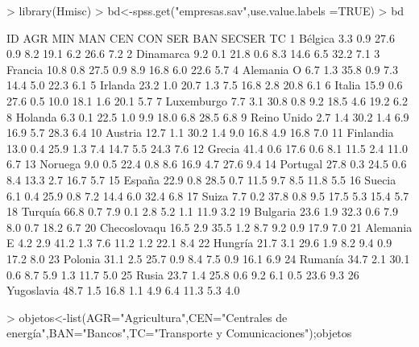 \documentclass{article}
\begin{document}
\begin{Schunk}
\begin{Sinput}
> library(Hmisc)
> bd<-spss.get("empresas.sav",use.value.labels =TRUE)
> bd
\end{Sinput}
\begin{Soutput}
             ID  AGR MIN  MAN CEN  CON  SER  BAN SECSER  TC
1  Bélgica       3.3 0.9 27.6 0.9  8.2 19.1  6.2   26.6 7.2
2  Dinamarca     9.2 0.1 21.8 0.6  8.3 14.6  6.5   32.2 7.1
3  Francia      10.8 0.8 27.5 0.9  8.9 16.8  6.0   22.6 5.7
4  Alemania O    6.7 1.3 35.8 0.9  7.3 14.4  5.0   22.3 6.1
5  Irlanda      23.2 1.0 20.7 1.3  7.5 16.8  2.8   20.8 6.1
6  Italia       15.9 0.6 27.6 0.5 10.0 18.1  1.6   20.1 5.7
7  Luxemburgo    7.7 3.1 30.8 0.8  9.2 18.5  4.6   19.2 6.2
8  Holanda       6.3 0.1 22.5 1.0  9.9 18.0  6.8   28.5 6.8
9  Reino Unido   2.7 1.4 30.2 1.4  6.9 16.9  5.7   28.3 6.4
10 Austria      12.7 1.1 30.2 1.4  9.0 16.8  4.9   16.8 7.0
11 Finlandia    13.0 0.4 25.9 1.3  7.4 14.7  5.5   24.3 7.6
12 Grecia       41.4 0.6 17.6 0.6  8.1 11.5  2.4   11.0 6.7
13 Noruega       9.0 0.5 22.4 0.8  8.6 16.9  4.7   27.6 9.4
14 Portugal     27.8 0.3 24.5 0.6  8.4 13.3  2.7   16.7 5.7
15 España       22.9 0.8 28.5 0.7 11.5  9.7  8.5   11.8 5.5
16 Suecia        6.1 0.4 25.9 0.8  7.2 14.4  6.0   32.4 6.8
17 Suiza         7.7 0.2 37.8 0.8  9.5 17.5  5.3   15.4 5.7
18 Turquía      66.8 0.7  7.9 0.1  2.8  5.2  1.1   11.9 3.2
19 Bulgaria     23.6 1.9 32.3 0.6  7.9  8.0  0.7   18.2 6.7
20 Checoslovaqu 16.5 2.9 35.5 1.2  8.7  9.2  0.9   17.9 7.0
21 Alemania E    4.2 2.9 41.2 1.3  7.6 11.2  1.2   22.1 8.4
22 Hungría      21.7 3.1 29.6 1.9  8.2  9.4  0.9   17.2 8.0
23 Polonia      31.1 2.5 25.7 0.9  8.4  7.5  0.9   16.1 6.9
24 Rumanía      34.7 2.1 30.1 0.6  8.7  5.9  1.3   11.7 5.0
25 Rusia        23.7 1.4 25.8 0.6  9.2  6.1  0.5   23.6 9.3
26 Yugoslavia   48.7 1.5 16.8 1.1  4.9  6.4 11.3    5.3 4.0
\end{Soutput}
\begin{Sinput}
> objetos<-list(AGR="Agricultura",CEN="Centrales de energía",BAN="Bancos",TC="Transporte y Comunicaciones");objetos
\end{Sinput}
\end{Schunk}
\end{document}
